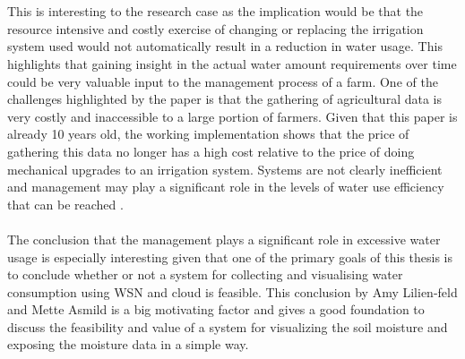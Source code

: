 \documentclass[]{uiophd}
\begin{document}
\\\\
This is interesting to the research case as the implication would be that the resource intensive and costly exercise of changing or replacing the irrigation system used would not automatically result in a reduction in water usage. This highlights that gaining insight in the actual water amount requirements over time could be very valuable input to the management process of a farm. One of  the challenges highlighted by the paper \cite{LILIENFELD200773} is that the gathering of agricultural data is very costly and inaccessible to a large portion of farmers. Given that this paper is already 10 years old, the working implementation shows that the price of gathering this data no longer has a high cost relative to the price of doing mechanical upgrades to an irrigation system. Systems are not clearly inefficient and management may play a significant role in the levels of water use efficiency that can be reached \cite{LILIENFELD200773}.
\\\\
The conclusion that the management plays a significant role in excessive water usage is especially interesting given that one of the primary goals of this thesis is to conclude whether or not a system for collecting and visualising water consumption using WSN and cloud is feasible. This conclusion by Amy Lilien-feld and Mette Asmild is a big motivating factor and gives a good foundation to discuss the feasibility and value of a system for visualizing the soil moisture and exposing the moisture data in a simple way.
\end{document}
